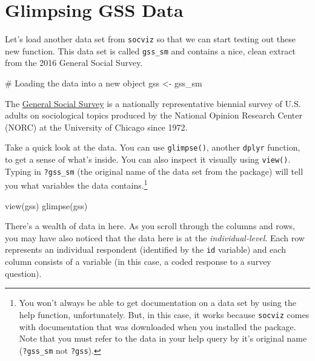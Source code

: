 \documentclass[
  letterpaper,
]{book}
\newenvironment{Shaded}{\begin{snugshade}}{\end{snugshade}}
\newcommand{\CommentTok}[1]{\textcolor[rgb]{0.37,0.37,0.37}{#1}}
\newcommand{\FunctionTok}[1]{\textcolor[rgb]{0.28,0.35,0.67}{#1}}
\newcommand{\NormalTok}[1]{\textcolor[rgb]{0.00,0.23,0.31}{#1}}
\newcommand{\OtherTok}[1]{\textcolor[rgb]{0.00,0.23,0.31}{#1}}
\begin{document}
\hypertarget{glimpsing-gss-data}{%
\section{Glimpsing GSS Data}\label{glimpsing-gss-data}}

Let's load another data set from \texttt{socviz} so that we can start
testing out these new function. This data set is called \texttt{gss\_sm}
and contains a nice, clean extract from the 2016 General Social Survey.

\begin{Shaded}
\begin{Highlighting}[]
\CommentTok{\# Loading the data into a new object}
\NormalTok{gss }\OtherTok{\textless{}{-}}\NormalTok{ gss\_sm}
\end{Highlighting}
\end{Shaded}

The \href{https://gss.norc.org/}{General Social Survey} is a nationally
representative biennial survey of U.S. adults on sociological topics
produced by the National Opinion Research Center (NORC) at the
University of Chicago since 1972.

Take a quick look at the data. You can use \texttt{glimpse()}, another
\texttt{dplyr} function, to get a sense of what's inside. You can also
inspect it visually using \texttt{view()}. Typing in \texttt{?gss\_sm}
(the original name of the data set from the package) will tell you what
variables the data contains.\footnote{You won't always be able to get
  documentation on a data set by using the help function, unfortunately.
  But, in this case, it works because \texttt{socviz} comes with
  documentation that was downloaded when you installed the package. Note
  that you must refer to the data in your help query by it's original
  name (\texttt{?gss\_sm} not \texttt{?gss}).}

\begin{Shaded}
\begin{Highlighting}[]
\FunctionTok{view}\NormalTok{(gss)}
\FunctionTok{glimpse}\NormalTok{(gss)}
\end{Highlighting}
\end{Shaded}

There's a wealth of data in here. As you scroll through the columns and
rows, you may have also noticed that the data here is at the
\emph{individual-level}. Each row represents an individual respondent
(identified by the \texttt{id} variable) and each column consists of a
variable (in this case, a coded response to a survey question).
\end{document}
